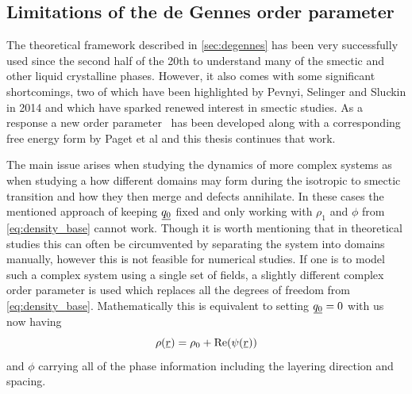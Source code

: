 \documentclass[12pt]{article}
\newcommand{\suf}[2]{\stackunder[1pt]{\ensuremath{#1}}{\rule{\widthof{\ensuremath{#2}}*\real{0.9}}{.1ex}}}
\newcommand{\duf}[2]{\stackunder[1pt]{\suf{\ensuremath{#1}}{#2}}{\rule{\widthof{\ensuremath{#2}}*\real{0.9}}{.1ex}}}
\newcommand{\su}[1]{\suf{#1}{#1}}
\newcommand{\du}[1]{\duf{#1}{#1}}
\newcommand{\EE}{\du{E}}
\begin{document}
\subsection{Limitations of the de Gennes order parameter}
The theoretical framework described in \cref{sec:degennes} has been very successfully used since the second half of the 20th to understand many of the smectic and other liquid crystalline phases.
However, it also comes with some significant shortcomings, two of which have been highlighted by Pevnyi, Selinger and Sluckin in 2014\cite{pevnyiModelingSmecticLayers2014} and which have sparked renewed interest in smectic studies.
As a response a new order parameter \EE\ has been developed along with a corresponding free energy form by Paget et al\cite{pagetSmecticLayeringLandau2022,pagetComplextensorTheorySimple2023} and this thesis continues that work.

The main issue arises when studying the dynamics of more complex systems as when studying a how different domains may form during the isotropic to smectic transition and how they then merge and defects annihilate\cite{ambrozicAnnihilationEdgeDislocations2004}.
In these cases the mentioned approach of keeping $\su{q_0}$ fixed and only working with $\rho_1$ and $\phi$ from \cref{eq:density_base} cannot work.
Though it is worth mentioning that in theoretical studies this can often be circumvented by separating the system into domains manually, however this is not feasible for numerical studies.
If one is to model such a complex system using a single set of fields, a slightly different complex order parameter is used which replaces all the degrees of freedom from \cref{eq:density_base}.
Mathematically this is equivalent to setting $\su{q_0} = 0$ with us now having
\begin{equation}\label{eq:density_pevnyi}
    \rho(\su{r}) = \rho_0 + \Re(\psi(\su{r}))
\end{equation}
and $\phi$ carrying all of the phase information including the layering direction and spacing.
\end{document}
